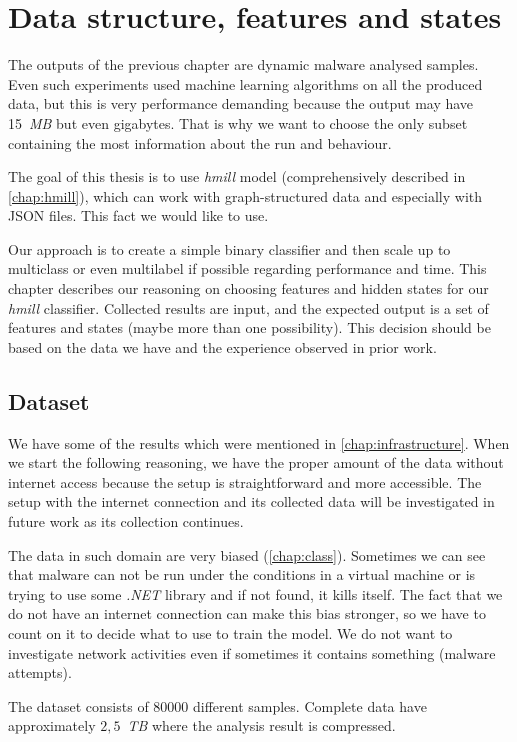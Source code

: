 \chapter{Data structure, features and states} \label{chap:data}
The outputs of the previous chapter are dynamic malware analysed samples. Even such experiments used machine learning algorithms on all the produced data, but this is very performance demanding because the output may have 15~\emph{MB} but even gigabytes. That is why we want to choose the only subset containing the most information about the run and behaviour. 

The goal of this thesis is to use \emph{hmill} model (comprehensively described in \ref{chap:hmill}), which can work with graph-structured data and especially with JSON files. This fact we would like to use.

Our approach is to create a simple binary classifier and then scale up to multiclass or even multilabel if possible regarding performance and time. This chapter describes our reasoning on choosing features and hidden states for our \emph{hmill} classifier.  Collected results are input, and the expected output is a set of features and states (maybe more than one possibility). This decision should be based on the data we have and the experience observed in prior work.


\section{Dataset}
We have some of the results which were mentioned in \ref{chap:infrastructure}. When we start the following reasoning, we have the proper amount of the data without internet access because the setup is straightforward and more accessible. The setup with the internet connection and its collected data will be investigated in future work as its collection continues. 

The data in such domain are very biased (\ref{chap:class}). Sometimes we can see that malware can not be run under the conditions in a virtual machine or is trying to use some \emph{.NET} library and if not found, it kills itself. The fact that we do not have an internet connection can make this bias stronger, so we have to count on it to decide what to use to train the model. We do not want to investigate network activities even if sometimes it contains something (malware attempts).

The dataset consists of $80000$ different samples. Complete data have approximately $2,5$~\emph{TB} where the analysis result is compressed.

